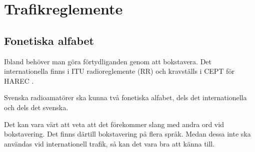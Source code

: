\chapter{Trafikreglemente}

\section{Fonetiska alfabet}

Ibland behöver man göra förtydliganden genom att bokstavera.
Det internationella finns i ITU radioreglemente (RR) \cite[Appendix 14]{ITU-RR}
och kravställs i CEPT för HAREC \cite[Annex 6]{TR6102}.

Svenska radioamatörer ska kunna två fonetiska alfabet, dels det
internationella och dels det svenska.

Det kan vara värt att veta att det förekommer slang med andra ord vid
bokstavering.
Det finns därtill bokstavering på flera språk.
Medan dessa inte ska användas vid internationell trafik, så kan det vara bra
att känna till.

